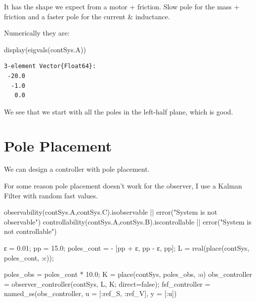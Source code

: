 \documentclass[
  a4paper,
  DIV=11,
  numbers=noendperiod]{scrreprt}
\newenvironment{Shaded}{\begin{snugshade}}{\end{snugshade}}
\newcommand{\ConstantTok}[1]{\textcolor[rgb]{0.56,0.35,0.01}{#1}}
\newcommand{\FloatTok}[1]{\textcolor[rgb]{0.68,0.00,0.00}{#1}}
\newcommand{\FunctionTok}[1]{\textcolor[rgb]{0.28,0.35,0.67}{#1}}
\newcommand{\NormalTok}[1]{\textcolor[rgb]{0.00,0.23,0.31}{#1}}
\newcommand{\OperatorTok}[1]{\textcolor[rgb]{0.37,0.37,0.37}{#1}}
\newcommand{\StringTok}[1]{\textcolor[rgb]{0.13,0.47,0.30}{#1}}
\begin{document}
It has the shape we expect from a motor + friction. Slow pole for the
mass + friction and a faster pole for the current \& inductance.

Numerically they are:

\begin{Shaded}
\begin{Highlighting}[]
\FunctionTok{display}\NormalTok{(}\FunctionTok{eigvals}\NormalTok{(contSys.A))}
\end{Highlighting}
\end{Shaded}

\begin{verbatim}
3-element Vector{Float64}:
 -20.0
  -1.0
   0.0
\end{verbatim}

We see that we start with all the poles in the left-half plane, which is
good.

\section{Pole Placement}\label{pole-placement-2}

We can design a controller with pole placement.

For some reason pole placement doesn't work for the observer, I use a
Kalman Filter with random fast values.

\begin{Shaded}
\begin{Highlighting}[]
\FunctionTok{observability}\NormalTok{(contSys.A,contSys.C).isobservable }\OperatorTok{||} \FunctionTok{error}\NormalTok{(}\StringTok{"System is not observable"}\NormalTok{)}
\FunctionTok{controllability}\NormalTok{(contSys.A,contSys.B).iscontrollable }\OperatorTok{||} \FunctionTok{error}\NormalTok{(}\StringTok{"System is not controllable"}\NormalTok{)}

\NormalTok{ε }\OperatorTok{=} \FloatTok{0.01}\NormalTok{;}
\NormalTok{pp }\OperatorTok{=} \FloatTok{15.0}\NormalTok{;}
\NormalTok{poles\_cont }\OperatorTok{=} \OperatorTok{{-}}\NormalTok{ [pp }\OperatorTok{+}\NormalTok{ ε, pp }\OperatorTok{{-}}\NormalTok{ ε, pp];}
\NormalTok{L }\OperatorTok{=} \FunctionTok{real}\NormalTok{(}\FunctionTok{place}\NormalTok{(contSys, poles\_cont, }\OperatorTok{:}\NormalTok{c));}


\NormalTok{poles\_obs }\OperatorTok{=}\NormalTok{ poles\_cont }\OperatorTok{*} \FloatTok{10.0}\NormalTok{;}
\NormalTok{K }\OperatorTok{=} \FunctionTok{place}\NormalTok{(contSys, poles\_obs, }\OperatorTok{:}\NormalTok{o)}
\NormalTok{obs\_controller }\OperatorTok{=} \FunctionTok{observer\_controller}\NormalTok{(contSys, L, K; direct}\OperatorTok{=}\ConstantTok{false}\NormalTok{);}
\NormalTok{fsf\_controller }\OperatorTok{=} \FunctionTok{named\_ss}\NormalTok{(obs\_controller, u }\OperatorTok{=}\NormalTok{ [}\OperatorTok{:}\NormalTok{ref\_S, }\OperatorTok{:}\NormalTok{ref\_V], y }\OperatorTok{=}\NormalTok{ [}\OperatorTok{:}\NormalTok{u])}
\end{Highlighting}
\end{Shaded}
\end{document}
